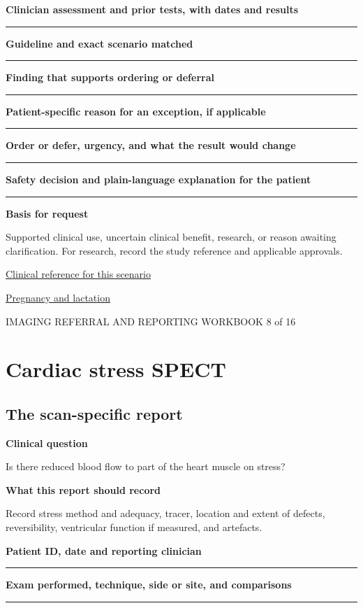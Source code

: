 \documentclass[11pt,a4paper]{article}
\newcommand{\record}[1]{\textbf{#1}\par\vspace{0.55\baselineskip}\hrule\vspace{0.35\baselineskip}}
\begin{document}
\record{Clinician assessment and prior tests, with dates and results}

\record{Guideline and exact scenario matched}

\record{Finding that supports ordering or deferral}

\record{Patient-specific reason for an exception, if applicable}

\record{Order or defer, urgency, and what the result would change}

\record{Safety decision and plain-language explanation for the patient}

\textbf{Basis for request}\par Supported clinical use, uncertain clinical benefit, research, or reason awaiting clarification. For research, record the study reference and applicable approvals.\par

\small\href{https://www.jacc.org/doi/10.1016/j.jacc.2021.07.053}{Clinical reference for this scenario}

\quad\href{https://pubmed.ncbi.nlm.nih.gov/28937575/}{Pregnancy and lactation}

\normalsize

\newpage

{\small IMAGING REFERRAL AND REPORTING WORKBOOK \hfill 8 of 16}

\section*{Cardiac stress SPECT}

\subsection*{The scan-specific report}

\textbf{Clinical question}\par Is there reduced blood flow to part of the heart muscle on stress?\par

\textbf{What this report should record}\par Record stress method and adequacy, tracer, location and extent of defects, reversibility, ventricular function if measured, and artefacts.\par

\record{Patient ID, date and reporting clinician}

\record{Exam performed, technique, side or site, and comparisons}
\end{document}
